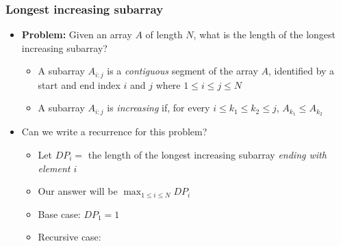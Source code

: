 \documentclass[t]{beamer}
\begin{document}
\begin{frame}

    \frametitle{Longest increasing subarray}

    \begin{itemize}

        \item

        \textbf{Problem:} Given an array $A$ of length $N$, what is the length of the longest increasing subarray?

        \begin{itemize}

            \item

            A subarray $A_{i:j}$ is a \textit{contiguous} segment of the array $A$, identified by a start and end index $i$ and $j$ where $1 \leq i \leq j \leq N$

            \item

            A subarray $A_{i:j}$ is \textit{increasing} if, for every $i \leq k_1 \leq k_2 \leq j$, $A_{k_1} \leq A_{k_2}$

        \end{itemize}

        \pause

        \item

        Can we write a recurrence for this problem?

        \pause

        \begin{itemize}

            \item

            Let $DP_i = $ the length of the longest increasing subarray \textit{ending with element $i$}

            \pause

            \item

            Our answer will be $\max_{1 \leq i \leq N} DP_i$

            \pause

            \item

            Base case: $DP_1 = 1$

            \item

            Recursive case:


\end{itemize}
\end{itemize}
\end{frame}
\end{document}
